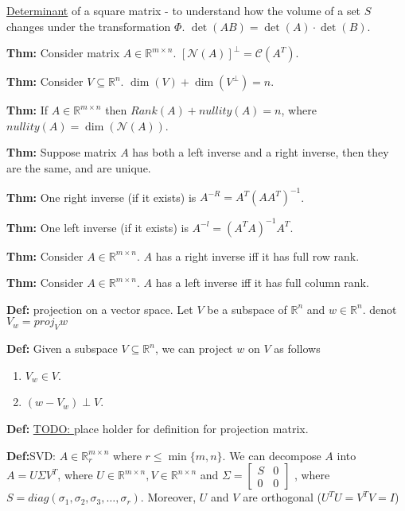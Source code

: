 \documentclass{report}
\begin{document}
\underline{Determinant} of a square matrix - to understand how the volume of a set
$S$ changes under the transformation $\Phi$. $\det(AB) = \det(A) \cdot \det(B)$.

\textbf{Thm:} Consider matrix $A \in \mathbb{R}^{m \times n}$. $[\mathcal{N}(A)]^{\perp} = \mathcal{C}(A^{T})$.

\textbf{Thm:} Consider $V \subseteq \mathbb{R}^n$. $\dim(V) + \dim(V^{\perp}) = n$.

\textbf{Thm:} If $A \in \mathbb{R}^{m \times n}$ then $Rank(A) + nullity(A) = n$, where $nullity(A) = \dim(\mathcal{N}(A))$.

\textbf{Thm:} Suppose matrix $A$ has both a left inverse and a right inverse, then they are the same, and are unique.

\textbf{Thm:} One right inverse (if it exists) is $A^{-R} = A^T(AA^T)^{-1}$.

\textbf{Thm:} One left inverse (if it exists) is $A^{-l} = (A^TA)^{-1}A^T$.

\textbf{Thm:} Consider $A \in \mathbb{R}^{m \times n}$. $A$ has a right inverse iff it has full row rank.

\textbf{Thm:} Consider $A \in \mathbb{R}^{m \times n}$. $A$ has a left inverse iff it has full column rank.

\textbf{Def:} projection on a vector space. Let $V$ be a subspace of $\mathbb{R}^n$ and $w \in \mathbb{R}^n$.
denot $\displaystyle V_w = proj_{V} w$

\textbf{Def:} Given a subspace $V \subseteq \mathbb{R}^n$, we can project $w$ on $V$ as follows
\begin{enumerate}
    \item $V_w \in V$.
    \item $(w - V_w) \perp V$.
\end{enumerate}

\textbf{Def:} \underline{TODO: } place holder for definition for projection matrix.

\textbf{Def:}SVD: $A \in \mathbb{R}_{r}^{m \times n}$ where $r \le \min \{m, n\}$. We can decompose $A$ into
$A = U \Sigma V^T$, where $U \in \mathbb{R}^{m \times n}, V \in \mathbb{R}^{n \times n}$ and
$\Sigma = \begin{bmatrix}
        S & 0 \\
        0 & 0
    \end{bmatrix}$
, where $S = diag(\sigma_1, \sigma_2, \sigma_3, \dots, \sigma_r)$. Moreover, $U$ and $V$ are orthogonal
($U^T U = V^T V = I$)
\end{document}
